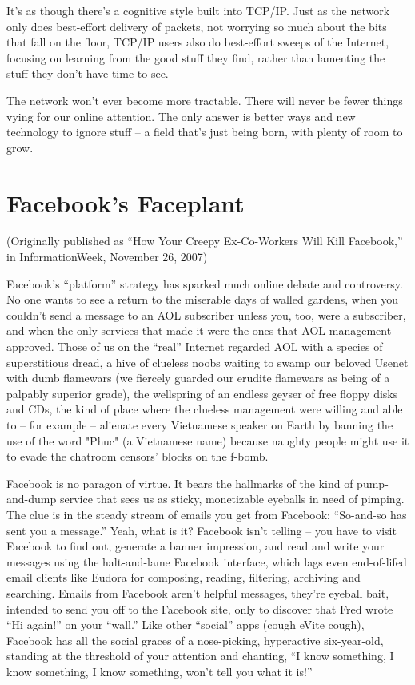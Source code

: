 It's as though there's a cognitive style built into TCP/IP. Just as
the network only does best-effort delivery of packets, not worrying
so much about the bits that fall on the floor, TCP/IP users also do
best-effort sweeps of the Internet, focusing on learning from the
good stuff they find, rather than lamenting the stuff they don't
have time to see.

The network won't ever become more tractable. There will never be
fewer things vying for our online attention. The only answer is
better ways and new technology to ignore stuff -- a field that's
just being born, with plenty of room to grow.

\section{Facebook's Faceplant}

(Originally published as ``How Your Creepy Ex-Co-Workers Will Kill
Facebook,'' in InformationWeek, November 26, 2007)

Facebook's ``platform'' strategy has sparked much online debate and
controversy. No one wants to see a return to the miserable days of
walled gardens, when you couldn't send a message to an AOL
subscriber unless you, too, were a subscriber, and when the only
services that made it were the ones that AOL management approved.
Those of us on the ``real'' Internet regarded AOL with a species of
superstitious dread, a hive of clueless noobs waiting to swamp our
beloved Usenet with dumb flamewars (we fiercely guarded our erudite
flamewars as being of a palpably superior grade), the wellspring of
an endless geyser of free floppy disks
and CDs, the kind of place where the clueless management were
willing and able to -- for example -- alienate every Vietnamese
speaker on Earth by banning the use of the word "Phuc" (a
Vietnamese name) because naughty people might use it to evade
the chatroom censors' blocks on the f-bomb.

Facebook is no paragon of virtue. It bears the hallmarks of the
kind of pump-and-dump service that sees us as sticky, monetizable
eyeballs in need of pimping. The clue is in the steady stream of
emails you get from Facebook: ``So-and-so has sent you a message.''
Yeah, what is it? Facebook isn't telling -- you have to visit
Facebook to find out, generate a banner impression, and read and
write your messages using the halt-and-lame Facebook interface,
which lags even end-of-lifed email clients like Eudora for
composing, reading, filtering, archiving and searching. Emails from
Facebook aren't helpful messages, they're eyeball bait, intended to
send you off to the Facebook site, only to discover that Fred wrote
``Hi again!'' on your ``wall.'' Like other ``social'' apps (cough eVite
cough), Facebook has all the social graces of a nose-picking,
hyperactive six-year-old, standing at the threshold of your
attention and chanting, ``I know something, I know something, I know
something, won't tell you what it is!''

